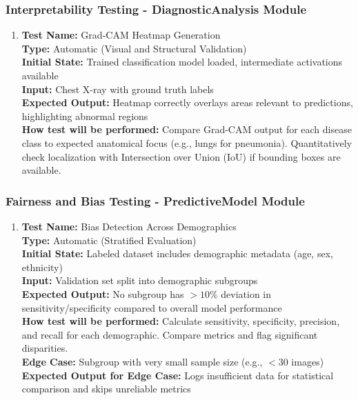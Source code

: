 \documentclass[12pt, titlepage]{article}
\begin{document}
\subsubsection{Interpretability Testing - DiagnosticAnalysis Module}

\begin{enumerate}
  \item \textbf{Test Name:} Grad-CAM Heatmap Generation \\
  \textbf{Type:} Automatic (Visual and Structural Validation) \\
  \textbf{Initial State:} Trained classification model loaded, intermediate activations available \\
  \textbf{Input:} Chest X-ray with ground truth labels \\
  \textbf{Expected Output:} Heatmap correctly overlays areas relevant to predictions, highlighting abnormal regions \\
  \textbf{How test will be performed:} Compare Grad-CAM output for each disease class to expected anatomical focus (e.g., lungs for pneumonia). Quantitatively check localization with Intersection over Union (IoU) if bounding boxes are available. \\
\end{enumerate}

\subsubsection{Fairness and Bias Testing - PredictiveModel Module}

\begin{enumerate}
  \item \textbf{Test Name:} Bias Detection Across Demographics \\
  \textbf{Type:} Automatic (Stratified Evaluation) \\
  \textbf{Initial State:} Labeled dataset includes demographic metadata (age, sex, ethnicity) \\
  \textbf{Input:} Validation set split into demographic subgroups \\
  \textbf{Expected Output:} No subgroup has $>10\%$ deviation in sensitivity/specificity compared to overall model performance \\
  \textbf{How test will be performed:} Calculate sensitivity, specificity, precision, and recall for each demographic. Compare metrics and flag significant disparities. \\
  \textbf{Edge Case:} Subgroup with very small sample size (e.g., $< 30$ images) \\
  \textbf{Expected Output for Edge Case:} Logs insufficient data for statistical comparison and skips unreliable metrics \\
\end{enumerate}
\end{document}
